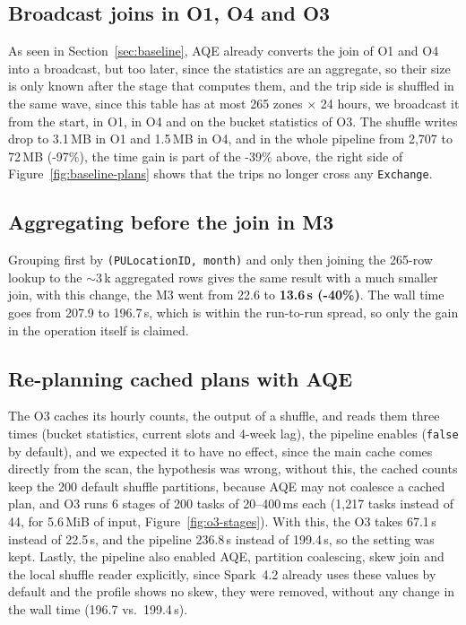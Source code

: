 \subsection{Broadcast joins in O1, O4 and O3}
\label{sec:opt-broadcast}
As seen in Section~\ref{sec:baseline}, AQE already converts the join of O1 and O4 into a
broadcast, but too later, since the statistics are an aggregate, so their size is only known after the
stage that computes them, and the trip side is shuffled in the same wave, since this table has
at most 265 zones $\times$ 24 hours, we broadcast it from the start, in O1, in O4 and on the bucket statistics of O3. 
The shuffle writes drop to 3.1\,MB in O1 and 1.5\,MB in O4, and in the whole pipeline from 2{,}707 to 72\,MB (-97\%), the time gain is part of
the -39\% above, the right side of Figure~\ref{fig:baseline-plans} shows that the trips no longer
cross any \texttt{Exchange}.


\subsection{Aggregating before the join in M3}
\label{sec:opt-m3}
Grouping first by \texttt{(PULocationID, month)} and only then joining the 265-row lookup to the
$\sim$3\,k aggregated rows gives the same result with a much smaller join, with this change, the M3 went from 22.6 to
\textbf{13.6\,s (-40\%)}. The wall time goes from 207.9 to 196.7\,s, which is within the run-to-run
spread, so only the gain in the operation itself is claimed.

\subsection{Re-planning cached plans with AQE}
\label{sec:opt-cachedaqe}
The O3 caches its hourly counts, the output of a shuffle, and reads them three times (bucket
statistics, current slots and 4-week lag), the pipeline enables
 (\texttt{false} by default), and we expected it to
have no effect, since the main cache comes directly from the scan, the hypothesis was wrong,
without this, the cached counts keep the 200 default shuffle partitions, because AQE may not
coalesce a cached plan, and O3 runs 6 stages of 200 tasks of 20--400\,ms each (1{,}217 tasks
instead of 44, for 5.6\,MiB of input, Figure~\ref{fig:o3-stages}). With this, the O3 takes 67.1\,s instead of 22.5\,s, and the pipeline
236.8\,s instead of 199.4\,s, so the setting was kept. 
Lastly, the pipeline also enabled AQE,
partition coalescing, skew join and the local shuffle reader explicitly, since Spark~4.2 already
uses these values by default and the profile shows no skew, they were removed, without any
change in the wall time (196.7 vs.\ 199.4\,s).

